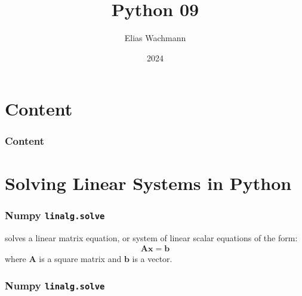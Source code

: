 \documentclass{beamer}
\title[]
{Python 09}
\author[E.~Wachmann]{\scriptsize Elias Wachmann
}
\date{2024} %
\institute[Institute of Theoretical and Computational Physics]
{
}
\begin{document}
\titleframe


\section*{Content}

\begin{frame}
\frametitle{Content}
  \tableofcontents
\end{frame}

\section{Solving Linear Systems in Python}
\begin{frame}
  \frametitle{Numpy \texttt{linalg.solve}}
   solves a linear matrix equation, or system of linear scalar equations of the form: 
  \begin{align}
    \mathbf{A} \mathbf{x} = \mathbf{b}
  \end{align}
  where $\mathbf{A}$ is a square matrix and $\mathbf{b}$ is a vector.\\
\end{frame}
\begin{frame}
  \frametitle{Numpy \texttt{linalg.solve}}
  
\end{frame}
\end{document}
